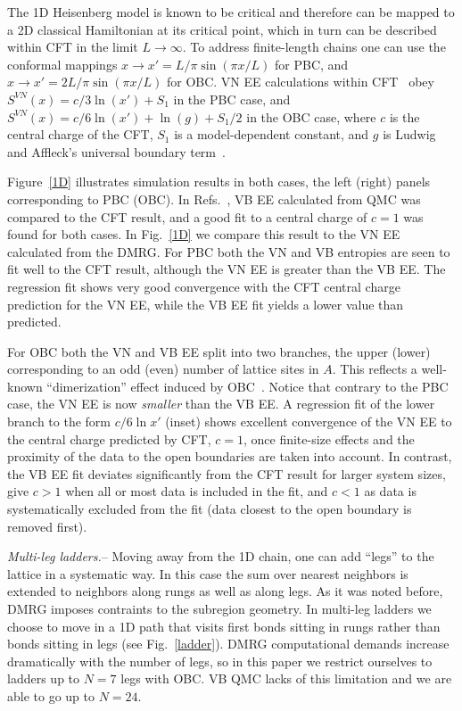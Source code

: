 \documentclass[prl,aps,twocolumn,floatfix,amsmath,amssymb,superscriptaddress,tightenlines]{revtex4}
\begin{document}
The 1D Heisenberg model is known to be critical and therefore can be
mapped to a 2D classical Hamiltonian at its critical point, which in turn
can be described within CFT in the limit $L\to\infty$.  To address
finite-length chains one can use the conformal mappings $x\to x'=L/\pi
\sin(\pi x / L)$ for PBC, and $x\to x'=2L/\pi \sin(\pi x / L)$ for OBC. VN
EE calculations within CFT~\cite{Cardy, Huanq2006} obey $S^{VN}(x)= c/3
\ln(x') + S_1$ in the PBC case, and $S^{VN}(x)= c/6 \ln(x') +
\ln(g)+S_1/2$ in the OBC case, where $c$ is the central charge of the CFT,
$S_1$ is a model-dependent constant, and $g$ is Ludwig and Affleck's
universal boundary term~\cite{AffleckAndLudwig}.

Figure~\ref{1D} illustrates simulation results in both cases, the left
(right) panels corresponding to PBC (OBC). In Refs.~\cite{Alet, Chh}, VB
EE calculated from QMC was compared to the CFT result, and a good fit to a
central charge of $c=1$ was found for both cases.  In Fig.~\ref{1D} we
compare this result to the VN EE calculated from the DMRG.  For PBC both
the VN and VB entropies are seen to fit well to the CFT result, although
the VN EE is greater than the VB EE. The regression fit shows very good
convergence with the CFT central charge prediction for the VN EE, while
the VB EE fit yields a lower value than predicted.  

For OBC both the VN and VB EE split into two branches, the upper (lower)
corresponding to an odd (even) number of lattice sites in $A$.  This
reflects a well-known ``dimerization'' effect induced by OBC~\cite{Ian1}.
Notice that contrary to the PBC case, the VN EE is now \textit{smaller}
than the VB EE. A regression fit of the lower branch to the form $c/6 \ln
{x'}$ (inset) shows excellent convergence of the VN EE to the central
charge predicted by CFT, $c=1$, once finite-size effects and the proximity
of the data to the open boundaries are taken into account.  In contrast,
the VB EE fit deviates significantly from the CFT result for larger system
sizes, give $c>1$ when all or most data is included in the fit, and $c<1$
as data is systematically excluded from the fit (data closest to the open
boundary is removed first).

{\it Multi-leg ladders.}-- Moving away from the 1D chain, one can add
``legs'' to the lattice in a systematic way. In this case the sum over
nearest neighbors is extended to neighbors along rungs as well as along
legs.  As it was noted before, DMRG imposes contraints to the subregion
geometry. In multi-leg ladders we choose to move in a 1D path that visits
first bonds sitting in rungs rather than bonds sitting in legs (see
Fig.~\ref{ladder}).  DMRG computational demands increase dramatically with
the number of legs, so in this paper we restrict ourselves to ladders up
to $N=7$ legs with OBC. VB QMC lacks of this limitation and we are able to
go up to $N=24$. 
\end{document}
